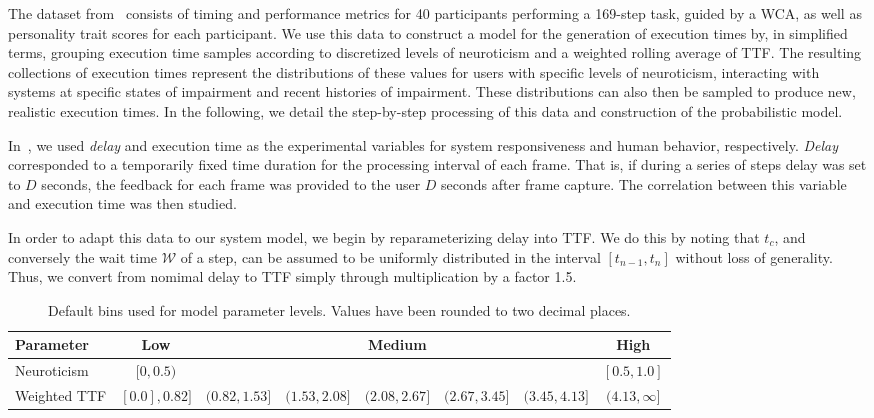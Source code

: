 The dataset from~\cite{olguinmunoz2021impact} consists of timing and performance metrics for \num{40} participants performing a \num{169}-step task, guided by a \gls{WCA}, as well as personality trait scores for each participant.
We use this data to construct a model for the generation of execution times by, in simplified terms, grouping execution time samples according to discretized levels of neuroticism and a weighted rolling average of \gls{TTF}.
The resulting collections of execution times represent the distributions of these values for users with specific levels of neuroticism, interacting with systems at specific states of impairment and recent histories of impairment.
These distributions can also then be sampled to produce new, realistic execution times.
In the following, we detail the step-by-step processing of this data and construction of the probabilistic model.

In~\cite{olguinmunoz2021impact}, we used \emph{delay} and execution time as the experimental variables for system responsiveness and human behavior, respectively.
\emph{Delay} corresponded to a temporarily fixed time duration for the processing interval of each frame.
That is, if during a series of steps delay was set to \( D \) seconds, the feedback for each frame was provided to the user \( D \) seconds after frame capture.
The correlation between this variable and execution time was then studied.

In order to adapt this data to our system model, we begin by reparameterizing delay into \gls{TTF}.
We do this by noting that \( t_c \), and conversely the wait time \( \mathcal{W} \) of a step, can be assumed to be uniformly distributed in the interval \( [t_{n - 1}, t_n] \) without loss of generality.
Thus, we convert from nomimal delay to \gls{TTF} simply through multiplication by a factor \num{1.5}.

\begin{table}[]
    \centering
    \caption{%
        Default bins used for model parameter levels.
        Values have been rounded to two decimal places.
    }
    \label{tab:defaultbins}
    \begin{tabular}{@{}lccccccc@{}}
        \toprule
        \textbf{Parameter} & \textbf{Low} & & & \textbf{Medium} & & & \textbf{High}         \\ \midrule
        Neuroticism        & \( [0, 0.5) \) & & & & & & \( [0.5, 1.0] \)      \\
        Weighted TTF & \([0.0], 0.82]\) & \((0.82, 1.53]\) & \((1.53, 2.08]\) & \((2.08, 2.67]\) & \((2.67, 3.45]\) & \((3.45, 4.13]\) & \((4.13, \infty]\)
    \end{tabular}
\end{table}

